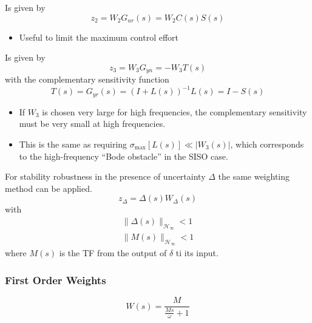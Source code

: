 \newpar{}


Is given by
\begin{equation*}
    z_2=W_2 G_{ur}(s) = W_2 C(s) S(s)
\end{equation*}
\begin{itemize}
    \item Useful to limit the maximum control effort
\end{itemize}

\newpar{}


Is given by
\begin{equation*}
    z_3= W_3 G_{yn} =-W_3 T(s)
\end{equation*}
with the complementary sensitivity function
\begin{equation*}
    T(s) = G_{yr}(s)={(I+L(s))}^{-1}L(s) = I-S(s)
\end{equation*}
\begin{itemize}
    \item If $W_3$ is chosen very large for high frequencies, the complementary sensitivity must be very small at high frequencies.
    \item This is the same as requiring $\sigma_{\max}[L(s)] \ll |W_3(s)|$, which corresponds to the high-frequency ``Bode obstacle'' in the SISO case.
\end{itemize}

\newpar{}


For stability robustness in the presence of uncertainty $\Delta$ the same weighting method can be applied.
\begin{equation*}
    z_\Delta = \Delta(s)W_\Delta(s)
\end{equation*}
with
\begin{gather*}
    \|\Delta(s)\|_{\mathcal{H}_\infty} < 1 \\
    \|M(s)\|_{\mathcal{H}_\infty} < 1
\end{gather*}
where $M(s)$ is the TF from the output of $\delta$ ti its input.

\subsubsection{First Order Weights}
\begin{equation*}
    W(s) = \frac{M}{\frac{Ms}{\omega}+1}
\end{equation*}

